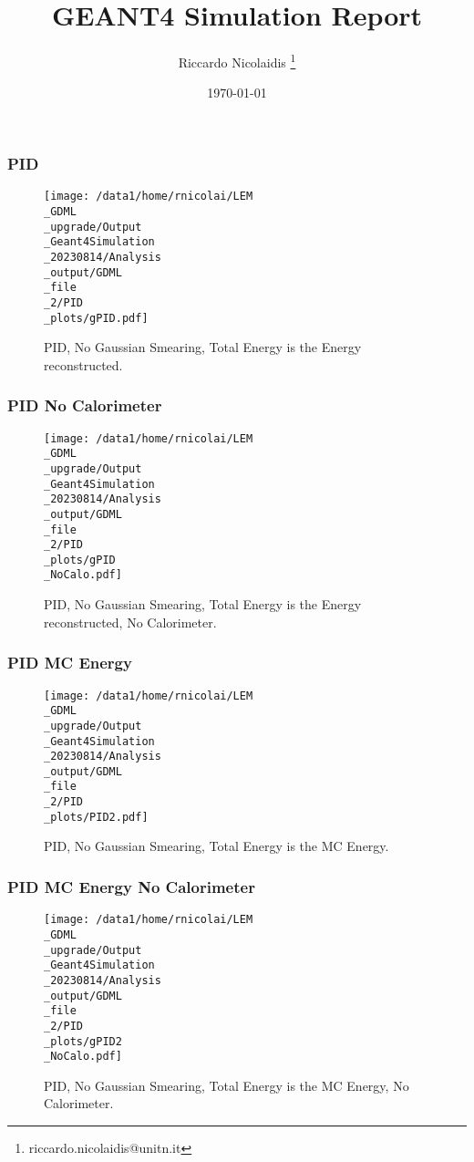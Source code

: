 \documentclass[8pt]{beamer}
\title{GEANT4 Simulation Report}
\author{Riccardo Nicolaidis \footnote{riccardo.nicolaidis@unitn.it}}
\date{\today}
\begin{document}
        
            \begin{frame}
                \titlepage
            \end{frame}
            
            \begin{frame}
                \frametitle{PID}
            
        \begin{figure}[h]
            \centering
            \texttt{[image: /data1/home/rnicolai/LEM\\\_GDML\\\_upgrade/Output\\\_Geant4Simulation\\\_20230814/Analysis\\\_output/GDML\\\_file\\\_2/PID\\\_plots/gPID.pdf]}
            \caption{PID, No Gaussian Smearing, Total Energy is the Energy reconstructed.}
        \end{figure}
        
            \end{frame}
            
            \begin{frame}
                \frametitle{PID No Calorimeter}
            
        \begin{figure}[h]
            \centering
            \texttt{[image: /data1/home/rnicolai/LEM\\\_GDML\\\_upgrade/Output\\\_Geant4Simulation\\\_20230814/Analysis\\\_output/GDML\\\_file\\\_2/PID\\\_plots/gPID\\\_NoCalo.pdf]}
            \caption{PID, No Gaussian Smearing, Total Energy is the Energy reconstructed, No Calorimeter.}
        \end{figure}
        
            \end{frame}
            
            \begin{frame}
                \frametitle{PID MC Energy}
            
        \begin{figure}[h]
            \centering
            \texttt{[image: /data1/home/rnicolai/LEM\\\_GDML\\\_upgrade/Output\\\_Geant4Simulation\\\_20230814/Analysis\\\_output/GDML\\\_file\\\_2/PID\\\_plots/PID2.pdf]}
            \caption{PID, No Gaussian Smearing, Total Energy is the MC Energy.}
        \end{figure}
        
            \end{frame}
            
            \begin{frame}
                \frametitle{PID MC Energy No Calorimeter}
            
        \begin{figure}[h]
            \centering
            \texttt{[image: /data1/home/rnicolai/LEM\\\_GDML\\\_upgrade/Output\\\_Geant4Simulation\\\_20230814/Analysis\\\_output/GDML\\\_file\\\_2/PID\\\_plots/gPID2\\\_NoCalo.pdf]}
            \caption{PID, No Gaussian Smearing, Total Energy is the MC Energy, No Calorimeter.}
        \end{figure}
        
            \end{frame}
            
\end{document}
